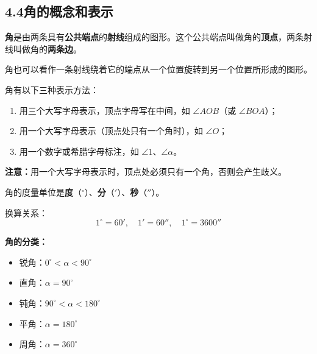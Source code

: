 \documentclass[12pt, a4paper]{ctexart}
\begin{document}
\subsection*{4.4\quad 角的概念和表示}

\begin{knowledgebox}[角的概念]
\textbf{角}是由两条具有\textbf{公共端点}的\textbf{射线}组成的图形。这个公共端点叫做角的\textbf{顶点}，两条射线叫做角的\textbf{两条边}。

角也可以看作一条射线绕着它的端点从一个位置旋转到另一个位置所形成的图形。

\begin{center}
\end{center}
\end{knowledgebox}

\begin{knowledgebox}[角的表示方法]
角有以下三种表示方法：
\begin{enumerate}[nosep]
  \item 用三个大写字母表示，顶点字母写在中间，如 $\angle AOB$（或 $\angle BOA$）；
  \item 用一个大写字母表示（顶点处只有一个角时），如 $\angle O$；
  \item 用一个数字或希腊字母标注，如 $\angle 1$、$\angle\alpha$。
\end{enumerate}

\textbf{注意：}用一个大写字母表示时，顶点处必须只有一个角，否则会产生歧义。
\end{knowledgebox}

\begin{knowledgebox}[角的度量单位及换算]
角的度量单位是\textbf{度}（$^\circ$）、\textbf{分}（$'$）、\textbf{秒}（$''$）。

换算关系：
$$1^\circ=60',\quad 1'=60'',\quad 1^\circ=3600''$$

\textbf{角的分类：}
\begin{itemize}[nosep]
  \item 锐角：$0^\circ<\alpha<90^\circ$
  \item 直角：$\alpha=90^\circ$
  \item 钝角：$90^\circ<\alpha<180^\circ$
  \item 平角：$\alpha=180^\circ$
  \item 周角：$\alpha=360^\circ$
\end{itemize}
\end{knowledgebox}
\end{document}
